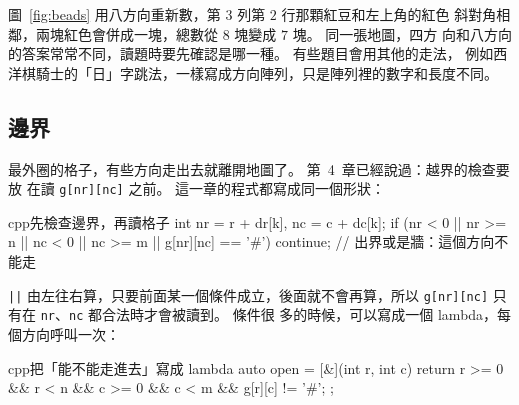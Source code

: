 \begin{center}
\par\nopagebreak
{}
\label{fig:dirs}
\end{center}

圖~\ref{fig:beads} 用八方向重新數，第 $3$ 列第 $2$ 行那顆紅豆和左上角的紅色
斜對角相鄰，兩塊紅色會併成一塊，總數從 $8$ 塊變成 $7$ 塊。 同一張地圖，四方
向和八方向的答案常常不同，讀題時要先確認是哪一種。 有些題目會用其他的走法，
例如西洋棋騎士的「日」字跳法，一樣寫成方向陣列，只是陣列裡的數字和長度不同。

\subsection{邊界}

最外圈的格子，有些方向走出去就離開地圖了。 第~4~章已經說過：越界的檢查要放
在讀 \texttt{g[nr][nc]} 之前。 這一章的程式都寫成同一個形狀：

\begin{code}{cpp}{先檢查邊界，再讀格子}
int nr = r + dr[k], nc = c + dc[k];
if (nr < 0 || nr >= n || nc < 0 || nc >= m || g[nr][nc] == '#') {
    continue;                       // 出界或是牆：這個方向不能走
}
\end{code}

\texttt{||} 由左往右算，只要前面某一個條件成立，後面就不會再算，所以
\texttt{g[nr][nc]} 只有在 \texttt{nr}、\texttt{nc} 都合法時才會被讀到。 條件很
多的時候，可以寫成一個 lambda，每個方向呼叫一次：

\begin{code}{cpp}{把「能不能走進去」寫成 lambda}
auto open = [&](int r, int c) {
    return r >= 0 && r < n && c >= 0 && c < m && g[r][c] != '#';
};
\end{code}

